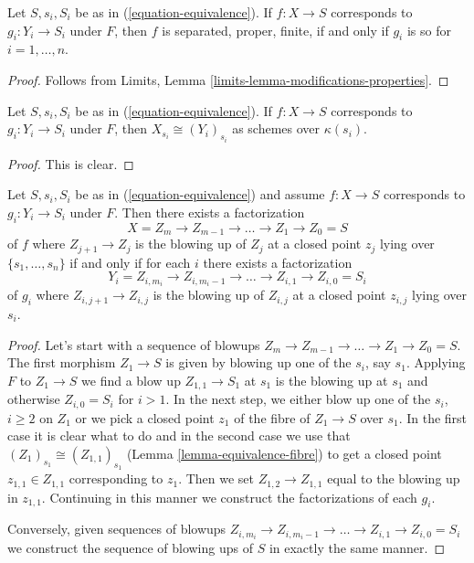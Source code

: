 \begin{lemma}
\label{lemma-equivalence-properties}
Let $S, s_i, S_i$ be as in (\ref{equation-equivalence}).
If $f : X \to S$ corresponds to $g_i : Y_i \to S_i$ under $F$,
then $f$ is separated, proper, finite, if and only if $g_i$ is so
for $i = 1, \ldots, n$.
\end{lemma}

\begin{proof}
Follows from Limits, Lemma
\ref{limits-lemma-modifications-properties}.
\end{proof}

\begin{lemma}
\label{lemma-equivalence-fibre}
Let $S, s_i, S_i$ be as in (\ref{equation-equivalence}).
If $f : X \to S$ corresponds to $g_i : Y_i \to S_i$ under $F$,
then $X_{s_i} \cong (Y_i)_{s_i}$ as schemes over $\kappa(s_i)$.
\end{lemma}

\begin{proof}
This is clear.
\end{proof}

\begin{lemma}
\label{lemma-equivalence-sequence-blowups}
Let $S, s_i, S_i$ be as in (\ref{equation-equivalence})
and assume $f : X \to S$ corresponds to $g_i : Y_i \to S_i$ under $F$.
Then there exists a factorization
$$
X = Z_m \to Z_{m - 1} \to \ldots \to Z_1 \to Z_0 = S
$$
of $f$ where $Z_{j + 1} \to Z_j$ is the blowing up of $Z_j$ at a closed
point $z_j$ lying over $\{s_1, \ldots, s_n\}$ if and only if for each
$i$ there exists a factorization
$$
Y_i = Z_{i, m_i} \to Z_{i, m_i - 1} \to \ldots \to Z_{i, 1} \to Z_{i, 0} = S_i
$$
of $g_i$ where $Z_{i, j + 1} \to Z_{i, j}$ is the blowing up of $Z_{i, j}$
at a closed point $z_{i, j}$ lying over $s_i$.
\end{lemma}

\begin{proof}
Let's start with a sequence of blowups
$Z_m \to Z_{m - 1} \to \ldots \to Z_1 \to Z_0 = S$.
The first morphism $Z_1 \to S$ is given
by blowing up one of the $s_i$, say $s_1$. Applying $F$
to $Z_1 \to S$ we find a blow up $Z_{1, 1} \to S_1$ at $s_1$
is the blowing up at $s_1$ and otherwise $Z_{i, 0} = S_i$ for $i > 1$.
In the next step, we either blow up one of the $s_i$, $i \geq 2$
on $Z_1$ or we pick a closed point $z_1$ of the fibre of $Z_1 \to S$
over $s_1$. In the first case it is clear what to do and in
the second case we use that $(Z_1)_{s_1} \cong (Z_{1, 1})_{s_1}$
(Lemma \ref{lemma-equivalence-fibre})
to get a closed point $z_{1, 1} \in Z_{1, 1}$ corresponding to $z_1$.
Then we set $Z_{1, 2} \to Z_{1, 1}$ equal to the blowing up
in $z_{1, 1}$. Continuing in this manner we construct the factorizations
of each $g_i$.

\medskip\noindent
Conversely, given sequences of blowups
$Z_{i, m_i} \to Z_{i, m_i - 1} \to \ldots \to Z_{i, 1} \to Z_{i, 0} = S_i$
we construct the sequence of blowing ups of $S$ in exactly the same manner.
\end{proof}

